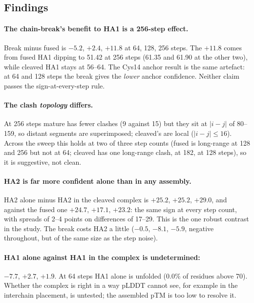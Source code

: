 \documentclass[11pt,a4paper]{article}
\begin{document}
\subsection{Findings}

\paragraph{The chain-break's benefit to HA1 is a 256-step effect.} Break minus
fused is $-5.2$, $+2.4$, $+11.8$ at 64, 128, 256 steps. The $+11.8$ comes from
fused HA1 dipping to 51.42 at 256 steps (61.35 and 61.90 at the other two),
while cleaved HA1 stays at 56--64. The Cys14 anchor result is the same
artefact: at 64 and 128 steps the break gives the \emph{lower} anchor
confidence. Neither claim passes the sign-at-every-step rule.

\paragraph{The clash \emph{topology} differs.} At 256 steps mature has fewer
clashes (9 against 15) but they sit at $|i-j|$ of 80--159, so distant segments
are superimposed; cleaved's are local ($|i-j|\le 16$). Across the sweep this
holds at two of three step counts (fused is long-range at 128 and 256 but not
at 64; cleaved has one long-range clash, at 182, at 128 steps), so it is
suggestive, not clean.

\paragraph{HA2 is far more confident alone than in any assembly.} HA2 alone
minus HA2 in the cleaved complex is $+25.2$, $+25.2$, $+29.0$, and against the
fused one $+24.7$, $+17.1$, $+23.2$: the same sign at every step count, with
spreads of 2--4 points on differences of 17--29. This is the one robust
contrast in the study. The break costs HA2 a little ($-0.5$, $-8.1$, $-5.9$,
negative throughout, but of the same size as the step noise).

\paragraph{HA1 alone against HA1 in the complex is undetermined:} $-7.7$,
$+2.7$, $+1.9$. At 64 steps HA1 alone is unfolded (0.0\% of residues above
70). Whether the complex is right in a way pLDDT cannot see, for example in
the interchain placement, is untested; the assembled pTM is too low to
resolve it.
\end{document}
